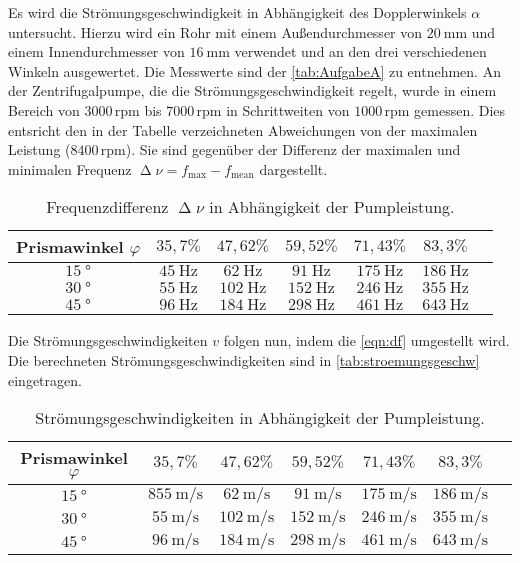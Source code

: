 \noindent
Es wird die Strömungsgeschwindigkeit in Abhängigkeit des Dopplerwinkels $\alpha$ untersucht. Hierzu wird ein Rohr mit einem Außendurchmesser von $\SI{20}{\milli\meter}$
und einem Innendurchmesser von $\SI{16}{\milli\meter}$ verwendet und an den drei verschiedenen Winkeln ausgewertet. Die Messwerte sind der \autoref{tab:AufgabeA} zu entnehmen.
An der Zentrifugalpumpe, die die Strömungsgeschwindigkeit regelt, wurde in einem Bereich von $3000 \,\text{rpm}$ bis $7000 \,\text{rpm}$ in Schrittweiten von $1000 \,\text{rpm}$ gemessen. Dies entsricht den in der
Tabelle verzeichneten Abweichungen von der maximalen Leistung ($8400\, \text{rpm}$). Sie sind gegenüber der Differenz der maximalen und minimalen Frequenz $\upDelta \nu = f_{\text{max}} - f_{\text{mean}}$ dargestellt.
\begin{table}[H]
  \centering
  \caption{Frequenzdifferenz $\upDelta \nu$ in Abhängigkeit der Pumpleistung.}
  \label{tab:AufgabeA}
  \begin{tabular}{c c c c c c c}
    \toprule
    Prismawinkel $\varphi$ & $35,7 \%$ & $47,62 \%$ & $59,52 \%$ & $71,43 \%$ & $83,3 \%$\\
    \midrule
    $\SI{15}{\degree}$ & $\SI{45}{\hertz}$ & $\SI{62}{\hertz}$ & $\SI{91}{\hertz}$ & $\SI{175}{\hertz}$ & $\SI{186}{\hertz}$ \\
    $\SI{30}{\degree}$ & $\SI{55}{\hertz}$ & $\SI{102}{\hertz}$ & $\SI{152}{\hertz}$ & $\SI{246}{\hertz}$ & $\SI{355}{\hertz}$ \\
    $\SI{45}{\degree}$ & $\SI{96}{\hertz}$ & $\SI{184}{\hertz}$ & $\SI{298}{\hertz}$ & $\SI{461}{\hertz}$ & $\SI{643}{\hertz}$ \\
    \bottomrule
  \end{tabular}
\end{table}

\noindent
Die Strömungsgeschwindigkeiten $v$ folgen nun, indem die \autoref{eqn:df} umgestellt wird. Die berechneten Strömungsgeschwindigkeiten sind in \autoref{tab:stroemungsgeschw} eingetragen.
\begin{table}[H]
  \centering
  \caption{Strömungsgeschwindigkeiten in Abhängigkeit der Pumpleistung.}
  \label{tab:stroemungsgeschw}
  \begin{tabular}{c c c c c c c}
    \toprule
    Prismawinkel $\varphi$ & $35,7 \%$ & $47,62 \%$ & $59,52 \%$ & $71,43 \%$ & $83,3 \%$\\
    \midrule
    $\SI{15}{\degree}$ & $\SI{855}{\meter\per\second}$ & $\SI{62}{\meter\per\second}$ & $\SI{91}{\meter\per\second}$ & $\SI{175}{\meter\per\second}$ & $\SI{186}{\meter\per\second}$ \\
    $\SI{30}{\degree}$ & $\SI{55}{\meter\per\second}$ & $\SI{102}{\meter\per\second}$ & $\SI{152}{\meter\per\second}$ & $\SI{246}{\meter\per\second}$ & $\SI{355}{\meter\per\second}$ \\
    $\SI{45}{\degree}$ & $\SI{96}{\meter\per\second}$ & $\SI{184}{\meter\per\second}$ & $\SI{298}{\meter\per\second}$ & $\SI{461}{\meter\per\second}$ & $\SI{643}{\meter\per\second}$ \\
    \bottomrule
  \end{tabular}
\end{table}

